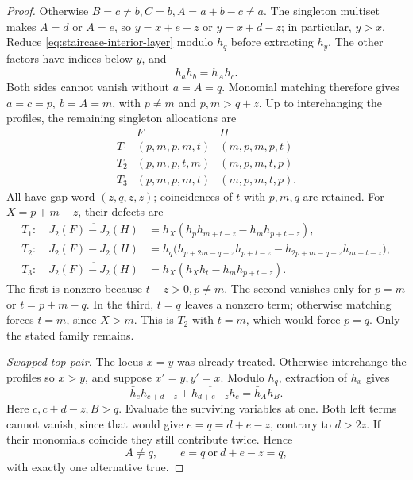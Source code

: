 \documentclass[11pt,a4paper]{amsart}
\numberwithin{equation}{section}
\theoremstyle{plain}
\theoremstyle{definition}
\begin{document}
\begin{proof}
Otherwise \(B=c\ne b,C=b,A=a+b-c\ne a\).
The singleton multiset makes \(A=d\) or \(A=e\), so
\(y=x+e-z\) or \(y=x+d-z\); in particular, \(y>x\).
Reduce \eqref{eq:staircase-interior-layer} modulo \(h_q\) before
extracting \(h_y\).  The other factors have indices below \(y\),
and
\[
 \bar h_ah_b=\bar h_Ah_c.
\]
Both sides cannot vanish without \(a=A=q\).  Monomial matching
therefore gives \(a=c=p,\ b=A=m\), with
\(p\ne m\) and \(p,m>q+z\).
Up to interchanging the profiles, the remaining singleton allocations are
\[
\begin{array}{c|c|c}
 &F&H\\\hline
 T_1&(p,m,p,m,t)&(m,p,m,p,t)\\
 T_2&(p,m,p,t,m)&(m,p,m,t,p)\\
 T_3&(p,m,p,m,t)&(m,p,m,t,p).
\end{array}
\]
All have gap word \((z,q,z,z)\); coincidences of \(t\) with
\(p,m,q\) are retained.  For \(X=p+m-z\), their defects are
\begin{align*}
 T_1:\quad\overline{J_2(F)-J_2(H)}
 &=h_X(h_ph_{m+t-z}-h_mh_{p+t-z}),\\
 T_2:\quad J_2(F)-J_2(H)
 &=h_q\bigl(h_{p+2m-q-z}h_{p+t-z}
            -h_{2p+m-q-z}h_{m+t-z}\bigr),\\
 T_3:\quad\overline{J_2(F)-J_2(H)}
 &=h_X(h_X\bar h_t-h_mh_{p+t-z}).
\end{align*}
The first is nonzero because \(t-z>0,p\ne m\).
The second vanishes only for \(p=m\) or \(t=p+m-q\).
In the third, \(t=q\) leaves a nonzero term; otherwise matching
forces \(t=m\), since \(X>m\).  This is \(T_2\) with \(t=m\),
which would force \(p=q\).  Only the stated family remains.

\emph{Swapped top pair.}
The locus \(x=y\) was already treated.  Otherwise interchange the
profiles so \(x>y\), and suppose \(x'=y,y'=x\).
Modulo \(h_q\), extraction of \(h_x\) gives
\begin{equation}\label{eq:staircase-interior-swap}
 \bar h_eh_{c+d-z}+\overline{h_{d+e-z}}h_c=\bar h_Ah_B.
\end{equation}
Here \(c,c+d-z,B>q\).  Evaluate the surviving variables at one.
Both left terms cannot vanish, since that would give
\(e=q=d+e-z\), contrary to \(d>2z\).  If their monomials
coincide they still contribute twice.  Hence
\[
 A\ne q,\qquad e=q\ \text{or}\ d+e-z=q,
\]
with exactly one alternative true.


\end{proof}
\end{document}
